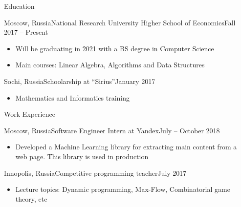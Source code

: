 \documentclass[]{mcdowellcv}
\begin{document}
	\makeheader



	\begin{cvsection}{Education}
		\begin{cvsubsection}{Moscow, Russia}{National Research University Higher School of Economics}{Fall 2017 -- Present}

                    \vskip 0.3cm

			\begin{itemize}
                            \item Will be graduating in 2021 with a BS degree in Computer Science
                            \item Main courses: Linear Algebra, Algorithms and Data Structures
			\end{itemize}
		\end{cvsubsection}

                \begin{cvsubsection}{Sochi, Russia}{Schoolarship at ``Sirius''}{January 2017}
                    \begin{itemize}
                        \item Mathematics and Informatics training
                    \end{itemize}
                \end{cvsubsection}

	\end{cvsection}

        \begin{cvsection}{Work Experience}
            \begin{cvsubsection}{Moscow, Russia}{Software Engineer Intern at Yandex}{July -- October 2018}
                \vskip 0.3cm
                \begin{itemize}
                    \item Developed a Machine Learning library for extracting main content from a web page. This library is used in production
                \end{itemize}
            \end{cvsubsection}
            \begin{cvsubsection}{Innopolis, Russia}{Competitive programming teacher}{July 2017}
                \vskip 0.3cm
                \begin{itemize}
                    \item Lecture topics: Dynamic programming, Max-Flow, Combinatorial game theory, etc
                \end{itemize}
            \end{cvsubsection}
        \end{cvsection}
\end{document}
